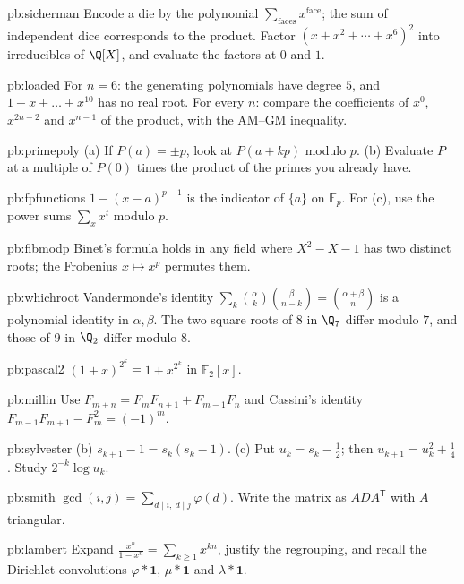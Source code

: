 \begin{hint}{pb:sicherman}
Encode a die by the polynomial $\sum_{\text{faces}}x^{\text{face}}$; the sum of independent dice corresponds to the product.
Factor $(x+x^2+\cdots+x^6)^2$ into irreducibles of $\Q[X]$, and evaluate the factors at $0$ and $1$.
\end{hint}
\begin{hint}{pb:loaded}
For $n=6$: the generating polynomials have degree $5$, and $1+x+\dots+x^{10}$ has no real root. For every $n$: compare the
coefficients of $x^0$, $x^{2n-2}$ and $x^{n-1}$ of the product, with the AM--GM inequality.
\end{hint}
\begin{hint}{pb:primepoly}
(a) If $P(a)=\pm p$, look at $P(a+kp)$ modulo $p$. (b) Evaluate $P$ at a multiple of $P(0)$ times the product of the primes
you already have.
\end{hint}
\begin{hint}{pb:fpfunctions}
$1-(x-a)^{p-1}$ is the indicator of $\{a\}$ on $\mathbb F_p$. For (c), use the power sums $\sum_xx^t$ modulo $p$.
\end{hint}
\begin{hint}{pb:fibmodp}
Binet's formula holds in any field where $X^2-X-1$ has two distinct roots; the Frobenius $x\mapsto x^p$ permutes them.
\end{hint}
\begin{hint}{pb:whichroot}
Vandermonde's identity $\sum_k\binom\alpha k\binom\beta{n-k}=\binom{\alpha+\beta}n$ is a polynomial identity in $\alpha,\beta$.
The two square roots of $8$ in $\Q_7$ differ modulo $7$, and those of $9$ in $\Q_2$ differ modulo $8$.
\end{hint}
\begin{hint}{pb:pascal2}
$(1+x)^{2^k}\equiv1+x^{2^k}$ in $\mathbb F_2[x]$.
\end{hint}
\begin{hint}{pb:millin}
Use $F_{m+n}=F_mF_{n+1}+F_{m-1}F_n$ and Cassini's identity $F_{m-1}F_{m+1}-F_m^2=(-1)^m$.
\end{hint}
\begin{hint}{pb:sylvester}
(b) $s_{k+1}-1=s_k(s_k-1)$. (c) Put $u_k=s_k-\frac12$; then $u_{k+1}=u_k^2+\frac14$. Study $2^{-k}\log u_k$.
\end{hint}
\begin{hint}{pb:smith}
$\gcd(i,j)=\sum_{d\mid i,\ d\mid j}\varphi(d)$. Write the matrix as $ADA^{\mathsf T}$ with $A$ triangular.
\end{hint}
\begin{hint}{pb:lambert}
Expand $\frac{x^n}{1-x^n}=\sum_{k\ge1}x^{kn}$, justify the regrouping, and recall the Dirichlet convolutions $\varphi*\mathbf1$,
$\mu*\mathbf1$ and $\lambda*\mathbf1$.
\end{hint}
